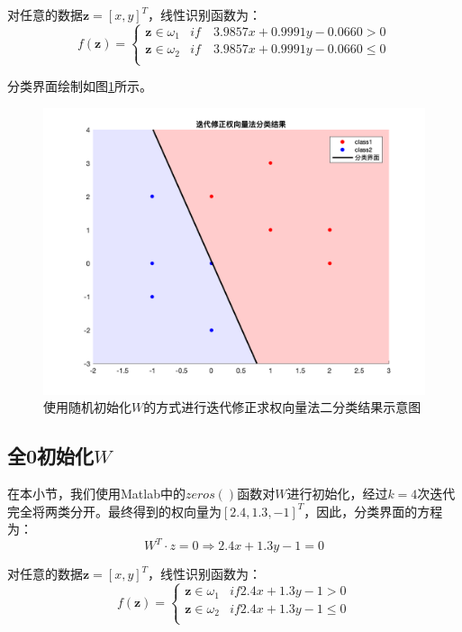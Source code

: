 \documentclass[cn]{elegantbook}
\begin{document}
对任意的数据$\mathbf{z}=[x,y]^T$，线性识别函数为：
\begin{equation}
f(\mathbf{z})=\left\{
\begin{array}{cc}
\mathbf{z}\in \omega_1 & if \quad 3.9857x + 0.9991y - 0.0660>0 \\
\mathbf{z}\in \omega_2 & if \quad 3.9857x + 0.9991y - 0.0660\le 0 \\
\end{array}
\right.
\end{equation}

分类界面绘制如图\ref{fig1}所示。
\begin{figure}[!h]
	\centering
	\includegraphics[width=\textwidth]{images/iterrand}
	\caption{\label{fig1}使用随机初始化$W$的方式进行迭代修正求权向量法二分类结果示意图}
\end{figure}

\subsection{全0初始化$W$}
在本小节，我们使用Matlab中的$zeros()$函数对$W$进行初始化，经过$k=4$次迭代完全将两类分开。最终得到的权向量为$[2.4,1.3,-1]^T$，因此，分类界面的方程为：
\begin{equation}
W^T\cdot z=0\Rightarrow 2.4x + 1.3y - 1=0
\end{equation}

对任意的数据$\mathbf{z}=[x,y]^T$，线性识别函数为：
\begin{equation}
f(\mathbf{z})=\left\{
\begin{array}{cc}
\mathbf{z}\in \omega_1 & if 2.4x + 1.3y - 1>0 \\
\mathbf{z}\in \omega_2 & if 2.4x + 1.3y - 1\le 0 \\
\end{array}
\right.
\end{equation}
\end{document}
